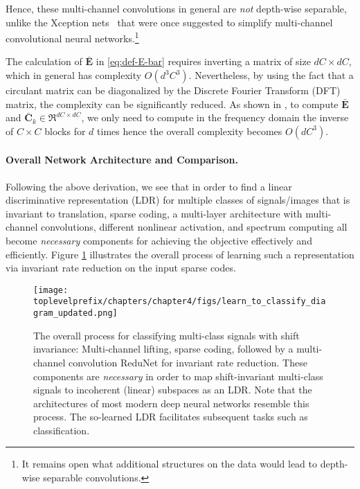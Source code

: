 \documentclass[../../book-main.tex]{subfiles}
\begin{document}
Hence, these multi-channel convolutions in general are {\em not} depth-wise separable, unlike the  Xception nets~\cite{Xception} that were once suggested to simplify multi-channel convolutional neural networks.\footnote{It remains open what additional structures on the data would lead to depth-wise separable convolutions.} 

\begin{remark} 
The calculation of $\bar{\bm E}$ in \eqref{eq:def-E-bar} requires inverting a matrix of size $dC \times dC$, which in general has complexity $O(d^3C^3)$.  Nevertheless, by using the fact that a circulant matrix can be diagonalized by the Discrete Fourier Transform (DFT) matrix, the complexity can be significantly reduced. As shown in \cite{chan2021redunet}, to compute $\bar{\bm E}$ and $\bar{\bm C}_k \in \Re^{dC \times dC}$, we only need to compute in the frequency domain the inverse of $C\times C$ blocks for $d$ times hence the overall complexity becomes $O(dC^3)$.
    
\end{remark}




\paragraph{Overall Network Architecture and Comparison.} 
Following the above derivation, we see that in order to find a linear discriminative representation (LDR)  for multiple classes of signals/images that is invariant to translation, sparse coding, a multi-layer architecture with multi-channel convolutions, different nonlinear activation, and spectrum computing all become {\em necessary} components for achieving the objective effectively and efficiently. Figure \ref{fig:learn-to-classify-diagram} illustrates the overall process of learning such a representation via invariant rate reduction on the input sparse codes. 

\begin{figure}[t]
    \centering
    \texttt{[image: \\toplevelprefix/chapters/chapter4/figs/learn\_to\_classify\_diagram\_updated.png]}
    \caption{The overall process for classifying multi-class signals with shift invariance: Multi-channel lifting,  sparse coding, followed by a multi-channel convolution ReduNet for invariant rate reduction. These components are {\em necessary} in order to map shift-invariant multi-class signals to incoherent (linear) subspaces as an LDR. Note that the architectures of most modern deep neural networks resemble this process. The so-learned LDR facilitates subsequent tasks such as classification.}
    \label{fig:learn-to-classify-diagram}
\end{figure}
\end{document}
